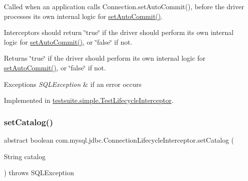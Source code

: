 Called when an application calls Connection.\+set\+Auto\+Commit(), before the driver processes its own internal logic for \mbox{\hyperlink{interfacecom_1_1mysql_1_1jdbc_1_1_connection_lifecycle_interceptor_af86c9f877791fe2dded81722568863b7}{set\+Auto\+Commit()}}.

Interceptors should return \char`\"{}true\char`\"{} if the driver should perform its own internal logic for \mbox{\hyperlink{interfacecom_1_1mysql_1_1jdbc_1_1_connection_lifecycle_interceptor_af86c9f877791fe2dded81722568863b7}{set\+Auto\+Commit()}}, or \char`\"{}false\char`\"{} if not.

\begin{DoxyReturn}{Returns}
\char`\"{}true\char`\"{} if the driver should perform its own internal logic for \mbox{\hyperlink{interfacecom_1_1mysql_1_1jdbc_1_1_connection_lifecycle_interceptor_af86c9f877791fe2dded81722568863b7}{set\+Auto\+Commit()}}, or \char`\"{}false\char`\"{} if not.
\end{DoxyReturn}

\begin{DoxyExceptions}{Exceptions}
{\em S\+Q\+L\+Exception} & if an error occurs \\
\hline
\end{DoxyExceptions}


Implemented in \mbox{\hyperlink{classtestsuite_1_1simple_1_1_test_lifecycle_interceptor_a98376ea207527feed3bc76d491c98cc2}{testsuite.\+simple.\+Test\+Lifecycle\+Interceptor}}.

\mbox{\label{interfacecom_1_1mysql_1_1jdbc_1_1_connection_lifecycle_interceptor_a1b4e6d4cd345e6ac103df4cc0d6807a1}} 
\subsubsection{\texorpdfstring{set\+Catalog()}{setCatalog()}}
{\footnotesize\ttfamily abstract boolean com.\+mysql.\+jdbc.\+Connection\+Lifecycle\+Interceptor.\+set\+Catalog (\begin{DoxyParamCaption}\item[{String}]{catalog }\end{DoxyParamCaption}) throws S\+Q\+L\+Exception\hspace{0.3cm}{\ttfamily [abstract]}}

